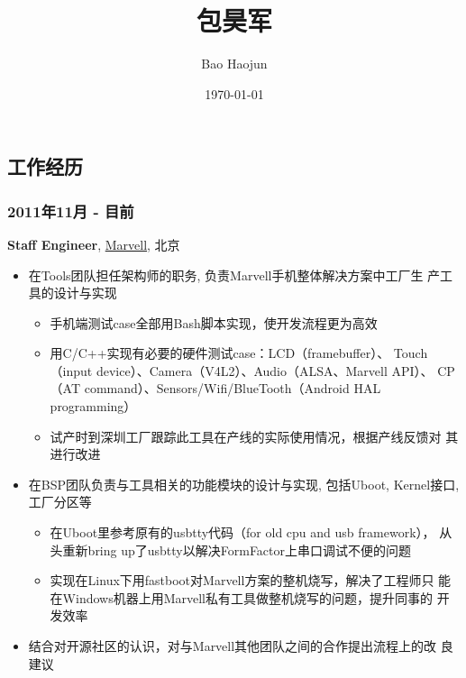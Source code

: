 \documentclass[11pt,dvipdfm,CJKbookmarks]{article}
\author{Bao Haojun}
\date{\today}
\title{包昊军}
\begin{document}
\begin{CJK*}{UTF8}{simsun}

\maketitle



\section{工作经历}
\label{sec-1}
\subsubsection{2011年11月 - 目前}
\label{sec-1-0-1}
\textbf{Staff Engineer}, \href{http://marvell.com}{Marvell}, 北京

\begin{itemize}
\item 在Tools团队担任架构师的职务, 负责Marvell手机整体解决方案中工厂生
产工具的设计与实现
\begin{itemize}
\item 手机端测试case全部用Bash脚本实现，使开发流程更为高效

\item 用C/C++实现有必要的硬件测试case：LCD（framebuffer）、
Touch（input device）、Camera（V4L2）、Audio（ALSA、Marvell API）、
CP（AT command）、Sensors/Wifi/BlueTooth（Android HAL
programming）

\item 试产时到深圳工厂跟踪此工具在产线的实际使用情况，根据产线反馈对
其进行改进
\end{itemize}

\item 在BSP团队负责与工具相关的功能模块的设计与实现, 包括Uboot, Kernel接口,
工厂分区等

\begin{itemize}
\item 在Uboot里参考原有的usbtty代码（for old cpu and usb framework），
从头重新bring up了usbtty以解决FormFactor上串口调试不便的问题
\item 实现在Linux下用fastboot对Marvell方案的整机烧写，解决了工程师只
能在Windows机器上用Marvell私有工具做整机烧写的问题，提升同事的
开发效率
\end{itemize}

\item 结合对开源社区的认识，对与Marvell其他团队之间的合作提出流程上的改
良建议
\end{itemize}

\end{CJK*}
\end{document}
